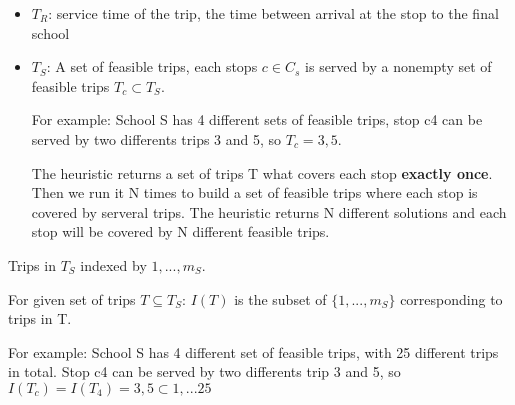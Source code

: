 \documentclass[11pt]{article}
\begin{document}
\begin{enumerate}
\begin{itemize}
\item \(T_R\): service time of the trip, the time between arrival at the stop to the final school

\item \(T_S\): A set of feasible trips, each stops \(c \in C_s\) is served by a nonempty 
set of feasible trips \(T_c \subset T_S\).

For example:
School S has 4 different sets of feasible trips, stop c4 can be served by two
differents trips 3 and 5, so \(T_c = {3,5}\).

The heuristic returns a set of trips T what covers each stop \textbf{\textbf{exactly once}}.
Then we run it N times to build a set of feasible trips where each stop is
covered by serveral trips. The heuristic returns N different solutions and
each stop will be covered by N different feasible trips.
\end{itemize}

Trips in \(T_S\) indexed by \(1,...,m_S\).

For given set of trips \(T \subseteq T_S\): \(I(T)\) is the subset of
\(\{1,...,m_S\}\) corresponding to trips in T.

For example:
School S has 4 different set of feasible trips, with 25 different trips in total.
Stop c4 can be served by two differents trip 3 and 5, so \(I(T_c) = I(T_4) = {3,5}
\subset {1,...25}\)
\end{enumerate}
\end{document}
